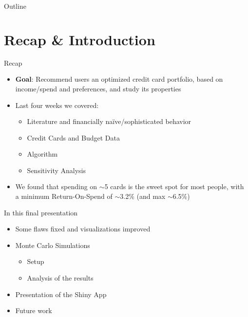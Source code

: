 


\begin{frame}{Outline}
    \tableofcontents
\end{frame}

\section{Recap \& Introduction}

\begin{frame}{Recap}
        \begin{itemize}
            \item {\bf Goal}: Recommend users an optimized credit card portfolio, based on  income/spend and preferences, and study its properties
            \bigskip
            \item Last four weeks we covered: 
            \begin{itemize}
                \item Literature and financially na\"{i}ve/sophisticated behavior
                \item Credit Cards and Budget Data
                \item Algorithm
                \item Sensitivity Analysis
            \end{itemize}
            \bigskip
            \item We found that spending on $\sim$5 cards is the sweet spot for most people, with a minimum Return-On-Spend of $\sim$3.2\% (and max $\sim$6.5\%)
        \end{itemize}
\end{frame} 

\begin{frame}{In this final presentation}
    \begin{itemize}
        \item Some flaws fixed and visualizations improved
        \bigskip
        \item Monte Carlo Simulations
        \begin{itemize}
            \item Setup
            \item Analysis of the results
        \end{itemize}
        \bigskip
        \item Presentation of the Shiny App
        \bigskip
        \item Future work
    \end{itemize}
\end{frame} 

